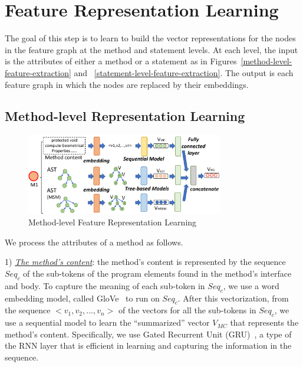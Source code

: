 \section{Feature Representation Learning}
\label{feature-learning:sec}

The goal of this step is to learn to build the vector representations
for the nodes in the feature graph at the method and statement levels.
At each level, the input is the attributes of either a method or a
statement as in Figures~\ref{method-level-feature-extraction} and
~\ref{statement-level-feature-extraction}. The output is each feature
graph in which the nodes are replaced by their embeddings.



\subsection{Method-level Representation Learning}

\begin{figure}[t]
	\centering
	\includegraphics[width=3.4in]{graphs/step-2-method-new.png}
	\caption{Method-level Feature Representation Learning}
	\label{method-level-feature-learning}
\end{figure}


We process the attributes of a method as follows.

1) {\em \underline{The method's content}}: the method's content is
represented by the sequence $Seq_c$ of the sub-tokens of the program
elements found in the method's interface and body. To capture the
meaning of each sub-token in $Seq_c$, we use a word embedding model,
called GloVe~\cite{glove2014} to run on $Seq_c$. After this
vectorization, from the sequence $<v_1,v_2, ..., v_n>$ of the vectors
for all the sub-tokens in $Seq_c$, we use a sequential model to learn
the ``summarized'' vector $V_{MC}$ that represents the method's
content. Specifically, we use Gated Recurrent Unit
(GRU)~\cite{cho2014learning}, a type of the RNN layer that is efficient in
learning and capturing the information in the sequence.

